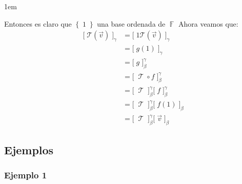 \documentclass[12pt, fleqn]{report}                             %
\newenvironment{SmallIndentation}[1][0.75em]                    %
        {\begin{adjustwidth}{#1}{}\begin{footnotesize}}             %
        {\end{footnotesize}\end{adjustwidth}}                       %
\theoremstyle{break}                                            %
\DeclareMathOperator \GenericField {\mathbb{F}}                 %
\DeclareMathOperator \LinTrans      {\mathcal{T}}               %
\newcommand{\Set}[1]            {\left\{ \; #1 \; \right\}}     %
\newcommand{\Wrap}[1]           {\left( #1 \right)}             %
\newcommand{\bigBrackets}[1]    {\big[ \; #1 \; \big]}          %
\newcommand{\FnLinTrans}[1]{\mathcal{T}\Wrap{#1}}               %
\begin{document}
\begin{itemize}
\begin{SmallIndentation}[1em]
                            Entonces es claro que $\Set{1}$ una base ordenada de $\GenericField$
                            Ahora veamos que:
                            \begin{align*}
                                \bigBrackets{\FnLinTrans{\vec v}}_\gamma 
                                    &= \bigBrackets{1 \FnLinTrans{\vec v}}_\gamma       \\
                                    &= \bigBrackets{g(1)}_\gamma                        \\
                                    &= \bigBrackets{g}_\beta^\gamma                     \\
                                    &= \bigBrackets{\LinTrans \circ f}_\beta^\gamma     \\
                                    &= \bigBrackets{\LinTrans}_\beta^\gamma
                                        \bigBrackets{f}_\beta^\gamma                    \\
                                    &= \bigBrackets{\LinTrans}_\beta^\gamma
                                        \bigBrackets{f(1)}_\beta                        \\
                                    &= \bigBrackets{\LinTrans}_\beta^\gamma
                                        \bigBrackets{\vec v}_\beta 
                            \end{align*}
                        
                        \end{SmallIndentation}
                            

                    

                \end{itemize}


            \clearpage
            \subsection{Ejemplos}

                \subsubsection{Ejemplo 1}
\end{document}
